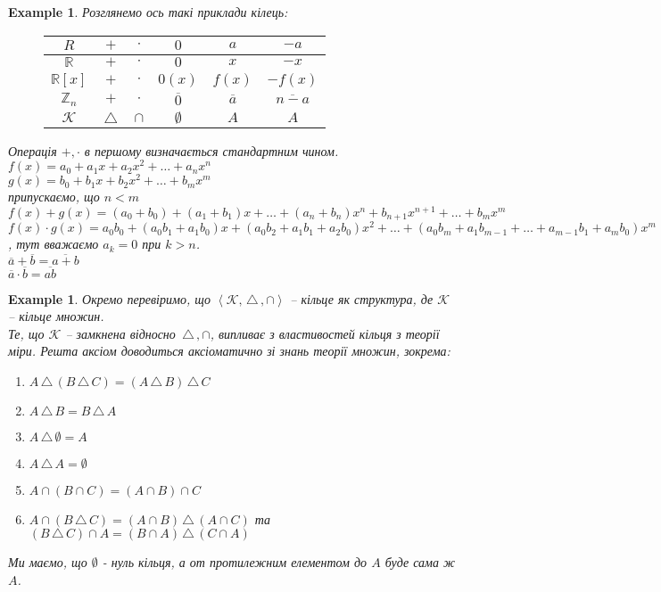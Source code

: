 \documentclass[a4paper, 10pt]{article}
\theoremstyle{theoremdd}
\theoremstyle{theoremdd}
\theoremstyle{theoremdd}
\theoremstyle{theoremdd}
\theoremstyle{theoremdd}
\newtheorem{example}[theorem]{Example}
\theoremstyle{theoremdd}
\theoremstyle{theoremdd}
\theoremstyle{theoremdd}
\theoremstyle{theoremdd}
\theoremstyle{theoremdd}
\theoremstyle{theoremdd}
\theoremstyle{theoremdd}
\theoremstyle{theoremdd}
\theoremstyle{theoremdd}
\theoremstyle{theoremdd}
\newcommand{\symdif}{\,\triangle\,} %
\begin{document}
\begin{example}
Розглянемо ось такі приклади кілець:
\begin{figure}[H]
\centering
\begin{tabular}{c|c|c|c|c|c}
$R$ & $+$ & $\cdot$ & $0$ & $a$ & $-a$ \\
\hline
$\mathbb{R}$ & $+$ & $\cdot$ & $0$ & $x$ & $-x$ \\
$\mathbb{R}[x]$ & $+$ & $\cdot$ & $0(x)$ & $f(x)$ & $-f(x)$ \\
$\mathbb{Z}_n$ & $+$ & $\cdot$ & $\overline{0}$ & $\overline{a}$ & $\overline{n-a}$ \\
$\mathcal{K}$ & $\symdif$ & $\cap$ & $\emptyset$ & $A$ & $A$
\end{tabular}
\end{figure}
Операція $+,\cdot$ в першому визначається стандартним чином.
\bigskip \\
$f(x) = a_0 + a_1x + a_2x^2 + \dots + a_nx^n$\\
$g(x) = b_0 + b_1x + b_2x^2 + \dots + b_mx^m$\\
припускаємо, що $n < m$\\
$f(x) + g(x) = (a_0+b_0) + (a_1+b_1)x + \dots + (a_n+b_n)x^n + b_{n+1}x^{n+1} + \dots + b_mx^m$\\
$f(x) \cdot g(x) = a_0b_0 + (a_0b_1+a_1b_0)x + (a_0b_2 + a_1b_1 + a_2b_0)x^2 + \dots +(a_0b_m+a_1b_{m-1}+\dots+ a_{m-1}b_1 + a_m b_0)x^m$, тут вважаємо $a_k = 0$ при $k > n$.
\bigskip \\
$\overline{a} + \overline{b} = \overline{a+b}$\\
$\overline{a} \cdot \overline{b} = \overline{ab}$
\end{example}

\begin{example}
Окремо перевіримо, що $\left<\mathcal{K}, \symdif, \cap \right>$ -- кільце як структура, де $\mathcal{K}$ -- кільце множин.\\
Те, що $\mathcal{K}$ -- замкнена відносно $\symdif, \cap$, випливає з властивостей кільця з теорії міри. Решта аксіом доводиться аксіоматично зі знань теорії множин, зокрема:
\begin{enumerate}[nosep,wide=0pt,label={\arabic*)}]
\item $A \symdif (B \symdif C) = (A \symdif B) \symdif C$
\item $A \symdif B = B \symdif A$
\item $A \symdif \emptyset = A$
\item $A \symdif A = \emptyset$
\item $A \cap (B \cap C) = (A \cap B) \cap C$
\item $A \cap (B \symdif C) = (A \cap B) \symdif (A \cap C)$ та $(B \symdif C) \cap A = (B \cap A) \symdif (C \cap A)$
\end{enumerate}
Ми маємо, що $\emptyset$ - нуль кільця, а от протилежним елементом до $A$ буде сама ж $A$.
\end{example}
\end{document}
